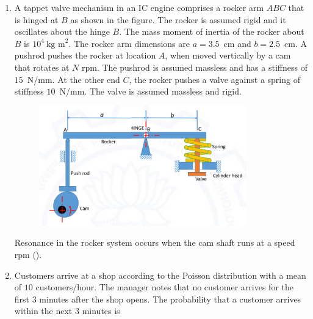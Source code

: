\documentclass[journal]{IEEEtran}
\begin{document}
\begin{enumerate}
\hfill{}

\item A tappet valve mechanism in an IC engine comprises a rocker arm $ABC$ that is hinged at $B$ as shown in the figure. The rocker is assumed rigid and it oscillates about the hinge $B$. The mass moment of inertia of the rocker about $B$ is $10^4~\text{kg m}^2$. The rocker arm dimensions are $a = 3.5$~cm and $b = 2.5$~cm. A pushrod pushes the rocker at location $A$, when moved vertically by a cam that rotates at $N$ rpm. The pushrod is assumed massless and has a stiffness of $15$~N/mm. At the other end $C$, the rocker pushes a valve against a spring of stiffness $10$~N/mm. The valve is assumed massless and rigid.
\begin{figure}[h]
\centering
\includegraphics[width=0.5\columnwidth]{Figs/image (51).png}
\caption*{}
\label{fig:32}
\end{figure}
Resonance in the rocker system occurs when the cam shaft runs at a speed \underline{\hspace{2cm}} rpm ().

\begin{enumerate}
\end{enumerate}

\hfill{}



\item Customers arrive at a shop according to the Poisson distribution with a mean of $10$ customers/hour. The manager notes that no customer arrives for the first $3$ minutes after the shop opens. The probability that a customer arrives within the next $3$ minutes is

\begin{enumerate}
\end{enumerate}


\end{enumerate}
\end{document}
